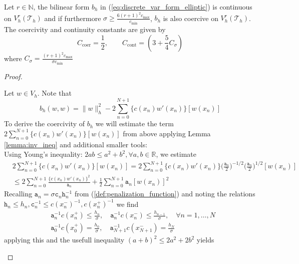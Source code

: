 \begin{theorem}
	\label{thr:cont_coerc_bilin_form}
	Let $r\in \mathbb{N}$, the bilinear form $b_h$ in (\ref{eq:discrete_var_form_elliptic}) is continuous
	on $V_h^r(\mathcal{T}_h)$ and if furthermore $\sigma \geq \frac{6 (r+1)^2 c_{\max} }{c_{\min}}$, $b_h$ is also
	coercive on $V_h^r(\mathcal{T}_h)$. 
	The coercivity and continuity constants are given by 
	\begin{equation*}
		C_{\text{coer}} = \frac{1}{2}, \qquad C_{\text{cont}} = (3 + \frac{5}{4} C_{\sigma}) 
	\end{equation*}
	where $C_{\sigma} = \frac{(r+1)^2 c_{\max} }{\sigma c_{\min}}$
\end{theorem}
\begin{proof}
	\begin{proofstep}[Coercivity]
		Let $w\in V_h$. Note that
		\begin{equation}
			\label{eq:coerc_thr_relation_bilin_form_with_norm}
			b_h(w,w) = \|w\|_h^2 - 2\sum_{n=0}^{N+1}\{c(x_n)w'(x_n)\}[w(x_n)]
		\end{equation}
		To derive the coercivity of $b_h$ we will estimate the term $2\sum_{n=0}^{N+1}\{c(x_n)w'(x_n)\}[w(x_n)]$
		from above applying Lemma \ref{lemma:inv_ineq} and additional smaller tools:\\
		Using Young's inequality: $2ab \leq a^2 + b^2, \forall a,b\in\mathbb{R}$, we estimate
		\begin{align}
			 & 2\sum_{n=0}^{N+1}\{c(x_n)w'(x_n)\}[w(x_n)] = 2\sum_{n=0}^{N+1}\{c(x_n)w'(x_n)\}
			\Big(\frac{\texttt{a}_n}{2}\Big)^{-1/2} \Big(\frac{\texttt{a}_n}{2}\Big)^{1/2} [w(x_n)]\nonumber \\
			 & \leq 2\sum_{n=0}^{N+1} \frac{\{c(x_n)w'(x_n)\}^2}{\texttt{a}_n}
			+ \frac{1}{2} \sum_{n=0}^{N+1} \texttt{a}_n [w(x_n)]^2 \label{eq:2_coerc_thr_first_estimate}
		\end{align}
		Recalling $\texttt{a}_n = \sigma \texttt{c}_n\texttt{h}_n^{-1}$ from (\ref{def:penalization_function}) and noting the relations
		$\texttt{h}_n \leq h_n, \texttt{c}_n^{-1} \leq c(x_n^-)^{-1}, c(x_n^+)^{-1}$ we find
		\begin{align*}
			 & \texttt{a}_n^{-1} c(x_n^+) \leq \frac{h_n}{\sigma}, \quad \texttt{a}_n^{-1} c(x_n^-) \leq \frac{h_{n-1}}{\sigma}, \quad \forall n=1,\ldots,N \\
			 & \texttt{a}_0^{-1} c(x_0^+) = \frac{h_0}{\sigma} , \quad \texttt{a}_{N+1}^{-1} c(x_{N+1}^-) = \frac{h_{N}}{\sigma}
		\end{align*}
		applying this and the usefull inequality $(a+b)^2 \leq 2a^2 + 2b^2$ yields

\end{proofstep}
\end{proof}
